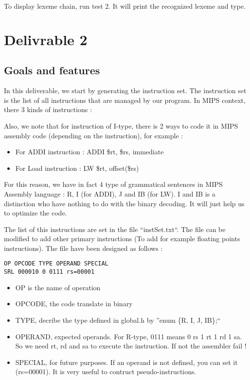 \documentclass[twoside,twocolumn]{article}
\begin{document}
To display lexeme chain, run test 2. It will print the recognized lexeme and type.


\section{Delivrable 2}

\subsection{Goals and features}
In this deliverable, we start by generating the instruction set. The instruction set is the list of all instructions that are managed by our program. In MIPS context, there 3 kinds of instructions :


Also, we note that for instruction of I-type, there is 2 ways to code it in MIPS assembly code (depending on the instruction), for example : 

\begin{itemize}
 \item For ADDI instruction : ADDI \$rt, \$rs, immediate
 \item For Load instruction : LW \$rt, offset(\$rs)
\end{itemize}

For this reason, we have in fact 4 type of grammatical sentences in MIPS Assembly language : R, I (for ADDI), J and IB (for LW). I and IB is a distinction who have nothing to do with the binary decoding. It will just help us to optimize the code.

The list of this instructions are set in the file ``instSet.txt``. The file can be modified to add other primary instructions (To add for example floating points instructions). The file have been designed as follows :

\begin{lstlisting}
OP OPCODE TYPE OPERAND SPECIAL
SRL 000010 0 0111 rs=00001
\end{lstlisting}

\begin{itemize}
 \item OP is the name of operation
 \item OPCODE, the code translate in binary
 \item TYPE, decribe the type defined in global.h by ''enum \{R, I, J, IB\};``
 \item OPERAND, expected operands. For R-type, 0111 means 0 rs 1 rt 1 rd 1 sa. So we need rt, rd and sa to execute the instruction. If not the assembler fail !
 \item SPECIAL, for future purposes. If an operand is not defined, you can set it (rs=00001). It is very useful to contruct pseudo-instructions.
\end{itemize}
\end{document}
